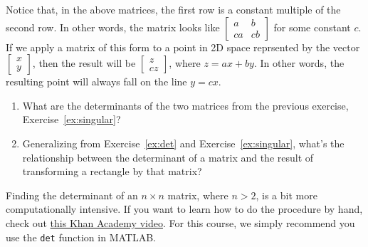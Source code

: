 \begin{sol}
 Notice that, in the above matrices, the first row is a constant multiple of the second row. In other words, the matrix looks like $\begin{bmatrix}
 a & b \\ ca & cb
 \end{bmatrix}$ for some constant $c$. If we apply a matrix of this form to a point in 2D space reprsented by the vector $\begin{bmatrix}
 x \\ y
 \end{bmatrix}$, then the result will be $\begin{bmatrix}
 z \\ cz
 \end{bmatrix}$, where $z=ax+by$. In other words, the resulting point will always fall on the line $y=cx$.
 \end{sol}
 
 \begin{prob}
 \begin{enumerate}
     \item What are the determinants of the two matrices from the previous exercise, Exercise~\ref{ex:singular}?
     \item Generalizing from Exercise~\ref{ex:det} and Exercise~\ref{ex:singular}, what's the relationship between the determinant of a matrix and the result of transforming a rectangle by that matrix?
 \end{enumerate}
 \end{prob}

Finding the determinant of an $n\times n$ matrix, where $n>2$, is a bit more computationally intensive. If you want to learn how to do the procedure by hand, check out \href{https://www.khanacademy.org/math/linear-algebra/matrix-transformations/inverse-of-matrices/v/linear-algebra-nxn-determinant}{this Khan Academy video}. For this course, we simply recommend you use the \texttt{det} function in MATLAB. 



